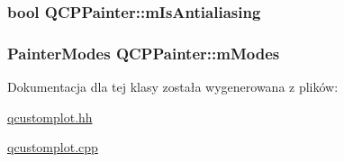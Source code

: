 \subsubsection[{\texorpdfstring{m\+Is\+Antialiasing}{mIsAntialiasing}}]{\setlength{\rightskip}{0pt plus 5cm}bool Q\+C\+P\+Painter\+::m\+Is\+Antialiasing\hspace{0.3cm}{\ttfamily [protected]}}\hypertarget{class_q_c_p_painter_a7055085da176aee0f6b23298f1003d08}{}\label{class_q_c_p_painter_a7055085da176aee0f6b23298f1003d08}
\subsubsection[{\texorpdfstring{m\+Modes}{mModes}}]{\setlength{\rightskip}{0pt plus 5cm}Painter\+Modes Q\+C\+P\+Painter\+::m\+Modes\hspace{0.3cm}{\ttfamily [protected]}}\hypertarget{class_q_c_p_painter_af5d1d6e5df0adbc7de5633250fb3396c}{}\label{class_q_c_p_painter_af5d1d6e5df0adbc7de5633250fb3396c}


Dokumentacja dla tej klasy została wygenerowana z plików\+:\begin{DoxyCompactItemize}
\item 
\hyperlink{qcustomplot_8hh}{qcustomplot.\+hh}\item 
\hyperlink{qcustomplot_8cpp}{qcustomplot.\+cpp}\end{DoxyCompactItemize}
